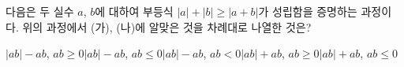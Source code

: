 다음은 두 실수 $a$, $b$에 대하여 부등식 $|a|+|b|\ge|a+b|$가 성립함을 증명하는 과정이다.  위의 과정에서 (가), (나)에 알맞은 것을 차례대로 나열한 것은?
\begin{choicesii}{$|ab|-ab$, $ab\ge 0$}{$|ab|-ab$, $ab\le 0$}{$|ab|-ab$, $ab<0$}{$|ab|+ab$, $ab\ge 0$}{$|ab|+ab$, $ab\le 0$}\end{choicesii}
